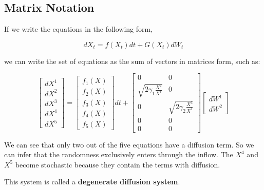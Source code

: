 \documentclass[conference]{IEEEtran}
\renewcommand{\medskip}{\vspace{1\baselineskip}}
\renewcommand{\smallskip}{\vspace{0.5\baselineskip}}
\theoremstyle{definitionsc}
\theoremstyle{plainsc}
\theoremstyle{remarksc}
\begin{document}
\medskip




\subsection*{\textbf{Matrix Notation}}


If we write the equations in the following form,

\begin{equation*}
	dX_t = f(X_t) dt + G(X_t) dW_t
\end{equation*}

we can write the set of equations as the sum of vectors in matrices form, such as:

\begin{equation*}
	\begin{bmatrix}
dX^1\\
dX^2\\
dX^3\\
dX^4\\
dX^5
\end{bmatrix}
=
\begin{bmatrix}
f_1(X)\\
f_2(X)\\
f_3(X)\\
f_4(X)\\
f_5(X)
\end{bmatrix}dt
+
\begin{bmatrix}
0 & 0\\
\sqrt{2\gamma_1\frac{X^2}{X^1}} & 0\\
0 & \sqrt{2\gamma_2\frac{X^3}{X^1}}\\
0 & 0\\
0 & 0
\end{bmatrix}
\begin{bmatrix}
dW^1\\
dW^2
\end{bmatrix}
\end{equation*}


\smallskip

We can see that only two out of the five equations have a diffusion term. So we can infer that the randomness exclusively enters through the inflow. The $X^4$ and $X^5$ become stochastic because they contain the terms with diffusion.

\smallskip

This system is called a \textbf{degenerate diffusion system}.
\end{document}
